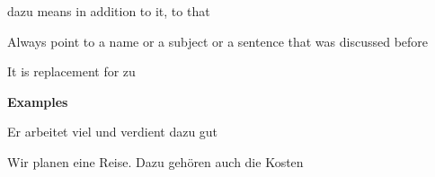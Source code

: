 dazu means in addition to it, to that

Always point to a name or a subject or a sentence that was discussed before

It is replacement for zu

\textbf{Examples}

Er arbeitet viel und verdient dazu gut

Wir planen eine Reise. Dazu gehören auch die Kosten

